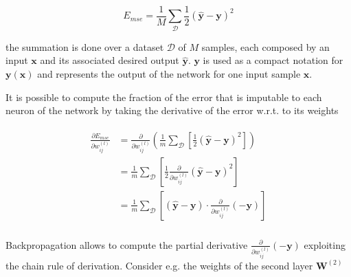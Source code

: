 \begin{equation}\label{eq:MSE}
    E_{mse} = \frac{1}{M} \sum_{\mathcal{D}}\frac{1}{2}(\mathbf{\hat y} - \mathbf{y})^2
\end{equation}

\noindent the summation is done over a dataset $\mathcal{D}$ of $M$ samples,
each composed by an input $\mathbf{x}$ and its associated desired output
$\mathbf{\hat y}$. $\mathbf{y}$ is used as a compact notation for
$\mathbf{y(x)}$ and represents the output of the network for one input sample
$\mathbf{x}$.

It is possible to compute the fraction of the error that is imputable to each
neuron of the network by taking the derivative of the error w.r.t. to its
weights

\begin{align}\label{eq:backprop_step1}
\begin{split}
    \frac{\partial E_{mse}}{\partial w_{ij}^{(l)}} &=
    \frac{\partial}{\partial w_{ij}^{(l)}}\left(
        \frac{1}{m}\sum_{\mathcal{D}}\left[
        \frac{1}{2}(\mathbf{\hat y} - \mathbf{y})^2\right]\right) \\
    &= \frac{1}{m}\sum_{\mathcal{D}} \left[\frac{1}{2}
        \frac{\partial}{\partial w_{ij}^{(l)}}
        \left(\mathbf{\hat y} - \mathbf{y}\right)^2\right] \\
    &= \frac{1}{m}\sum_{\mathcal{D}}\left[(\mathbf{\hat y} - \mathbf{y})
        \cdot \frac{\partial}{\partial w_{ij}^{(l)}}(-\mathbf{y})\right] \\
\end{split}
\end{align}

Backpropagation allows to compute the partial derivative
$\frac{\partial}{\partial w_{ij}^{(l)}}(-\mathbf{y})$
exploiting the chain rule of derivation. Consider e.g. the weights of the
second layer $\mathbf{W}^{(2)}$

